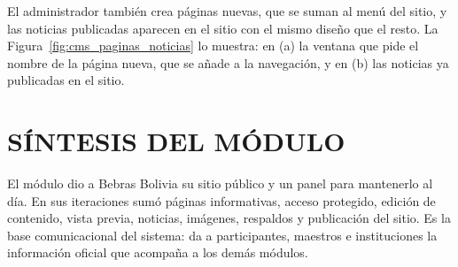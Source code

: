 
El administrador también crea páginas nuevas, que se suman al menú del sitio, y las noticias publicadas aparecen en el sitio con el mismo diseño que el resto. La Figura~\ref{fig:cms_paginas_noticias} lo muestra: en (a) la ventana que pide el nombre de la página nueva, que se añade a la navegación, y en (b) las noticias ya publicadas en el sitio.


\section{SÍNTESIS DEL MÓDULO}

El módulo dio a Bebras Bolivia su sitio público y un panel para mantenerlo al día. En sus iteraciones sumó páginas informativas, acceso protegido, edición de contenido, vista previa, noticias, imágenes, respaldos y publicación del sitio. Es la base comunicacional del sistema: da a participantes, maestros e instituciones la información oficial que acompaña a los demás módulos.
